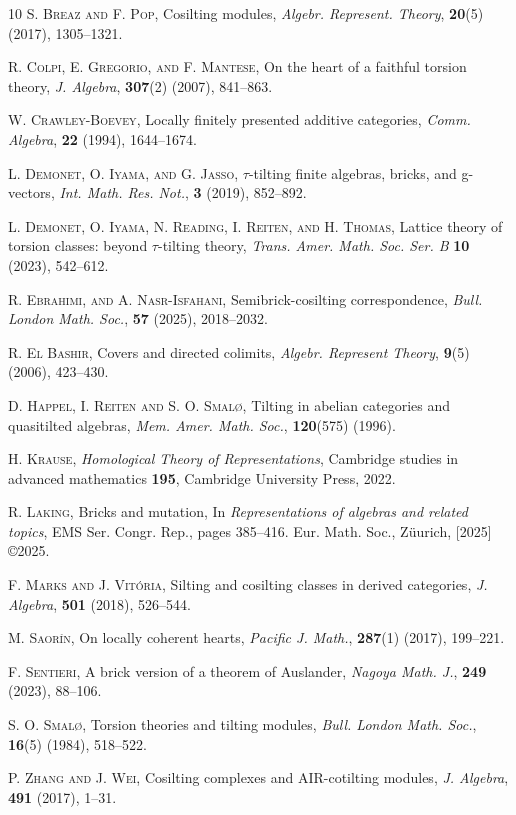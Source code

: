 \documentclass[12pt]{amsart}
\numberwithin{equation}{section}
\theoremstyle{definition}
\newtheorem*{theorem 0*}{Theorem}
\newtheorem*{theorem a*}{Theorem A}
\newtheorem*{theorem b*}{Theorem B}
\numberwithin{diagram}{section}
\begin{document}
\begin{thebibliography}{10}
		 \textsc{S. Breaz and F. Pop}, Cosilting modules, \emph{Algebr. Represent. Theory}, \textbf{20}(5) (2017), 1305--1321.
		
		 \textsc{R. Colpi, E. Gregorio, and F. Mantese}, On the heart of a faithful torsion theory, \emph{J. Algebra}, \textbf{307}(2) (2007), 841--863.
		
		 \textsc{W. Crawley-Boevey}, Locally finitely presented additive categories, \emph{Comm. Algebra}, \textbf{22} (1994), 1644--1674.

         \textsc{L. Demonet, O. Iyama, and G. Jasso}, $\tau$-tilting finite algebras, bricks, and g-vectors, \emph{Int. Math. Res. Not.}, \textbf{3} (2019), 852--892.
		
		 \textsc{L. Demonet, O. Iyama, N. Reading, I. Reiten, and H. Thomas}, Lattice theory of torsion classes: beyond $\tau$-tilting theory, \emph{Trans. Amer. Math. Soc. Ser. B} \textbf{10} (2023), 542--612.

         \textsc{R. Ebrahimi, and A. Nasr-Isfahani}, Semibrick-cosilting correspondence, \emph{Bull. London Math. Soc.}, \textbf{57} (2025), 2018--2032.

         \textsc{R. El Bashir}, Covers and directed colimits, \emph{Algebr. Represent Theory}, \textbf{9}(5) (2006), 423--430.
		
		 \textsc{D. Happel, I. Reiten and S. O. Smal{\o}}, Tilting in abelian categories and quasitilted algebras, \emph{Mem. Amer. Math. Soc.}, \textbf{120}(575) (1996).

         \textsc{H. Krause}, \emph{Homological Theory of Representations}, Cambridge studies in advanced mathematics \textbf{195}, Cambridge University Press, 2022.
		
		 \textsc{R. Laking}, Bricks and mutation, In \emph{Representations of algebras and related topics}, EMS Ser. Congr. Rep., pages 385--416. Eur. Math. Soc., Z{\"u}urich, [2025] ©2025.
	
	     \textsc{F. Marks and J. Vit{\'o}ria}, Silting and cosilting classes in derived categories, \emph{J. Algebra}, \textbf{501} (2018), 526--544.
	    
	     \textsc{M. Saor{\'\i}n}, On locally coherent hearts, \emph{Pacific J. Math.}, \textbf{287}(1) (2017), 199--221.
		
		 \textsc{F. Sentieri}, A brick version of a theorem of Auslander, \emph{Nagoya Math. J.}, \textbf{249} (2023), 88--106.
		
		 \textsc{S. O. Smal{\o}}, Torsion theories and tilting modules, \emph{Bull. London Math. Soc.}, \textbf{16}(5) (1984), 518--522.
		
		 \textsc{P. Zhang and J. Wei}, Cosilting complexes and AIR-cotilting modules, \emph{J. Algebra}, \textbf{491} (2017), 1--31.
		
		
	\end{thebibliography}
	
	
	
	
\end{document}
